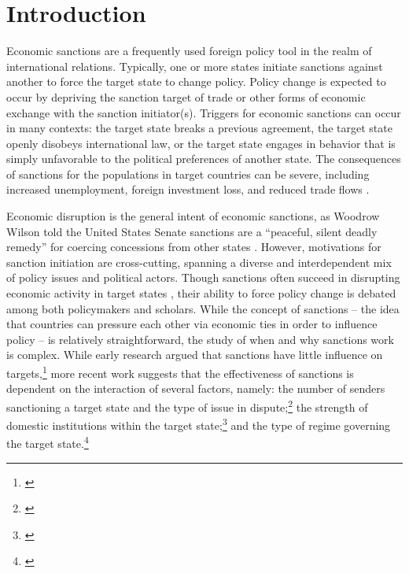 \section*{Introduction}
\label{intro}

Economic sanctions are a frequently used foreign policy tool in the realm of international relations. Typically, one or more states initiate sanctions against another to force the target state to change policy. Policy change is expected to occur by depriving the sanction target of trade or other forms of economic exchange with the sanction initiator(s). Triggers for economic sanctions can occur in many contexts: the target state breaks a previous agreement, the target state openly disobeys international law, or the target state engages in behavior that is simply unfavorable to the political preferences of another state. The consequences of sanctions for the populations in target countries can be severe, including increased unemployment, foreign investment loss, and reduced trade flows \citep{hufbauer2003impact,hufbauer1997us}. 

Economic disruption is the general intent of economic sanctions, as Woodrow Wilson told the United States Senate sanctions are a ``peaceful, silent deadly remedy'' for coercing concessions from other states \citep{foley23}. However, motivations for sanction initiation are cross-cutting, spanning a diverse and interdependent mix of policy issues and political actors. Though sanctions often succeed in disrupting economic activity in target states \citep{escriba2010dealing}, their ability to force policy change is debated among both policymakers and scholars.  While the concept of sanctions -- the idea that countries can pressure each other via economic ties in order to influence policy -- is relatively straightforward, the study of when and why sanctions work is complex. While early research argued that sanctions have little influence on targets,\footnote{\cite{lam1990, dashti1997, morgan1997, drezner1998}} more recent work suggests that the effectiveness of sanctions is dependent on the interaction of several factors, namely: the number of senders sanctioning a target state and the type of issue in dispute;\footnote{\cite{miers2002, morgan2009threat}} the strength of domestic institutions within the target state;\footnote{\cite{dashti1997,marinov2005}} and the type of regime governing the target state.\footnote{\cite{mcgillivray2004,lektzian2007,allen2008domestic}} 


